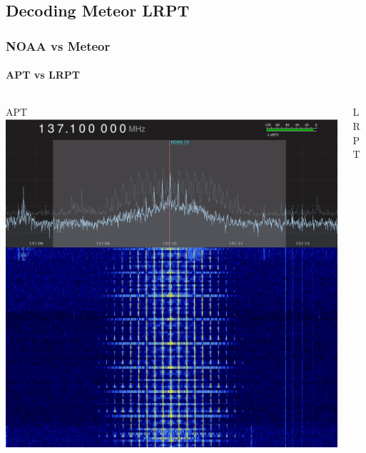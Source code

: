 \documentclass[]{beamer}
\begin{document}
\subsection{Decoding Meteor LRPT}
\frame{\subsectionpage}
\begin{frame}
    \frametitle{NOAA vs Meteor}
    \framesubtitle{APT vs LRPT}
    \begin{columns}[T]
        \begin{column}[T]{5cm}
            APT
            \includegraphics[width=0.45\paperwidth,height=0.7\paperheight,keepaspectratio]{images/apt-gqrx.png}
        \end{column}
        \begin{column}[T]{5cm}
            LRPT

\end{column}
\end{columns}
\end{frame}
\end{document}
